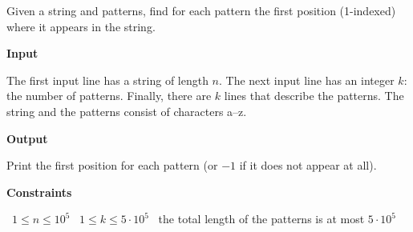Given a string and patterns, find for each pattern the first position (1-indexed) where it appears in the string.

\vspace{0.3cm}\noindent\textbf{Input}

The first input line has a string of length $n$.
The next input line has an integer $k$: the number of patterns. Finally, there are $k$ lines that describe the patterns.
The string and the patterns consist of characters a–z.

\vspace{0.3cm}\noindent\textbf{Output}

Print the first position for each pattern (or $-1$ if it does not appear at all).

\vspace{0.3cm}\noindent\textbf{Constraints}

\textbullet\ $1 \le n \le 10^5$
\textbullet\ $1 \le k \le 5 \cdot 10^5$
\textbullet\ the total length of the patterns is at most $5 \cdot 10^5$